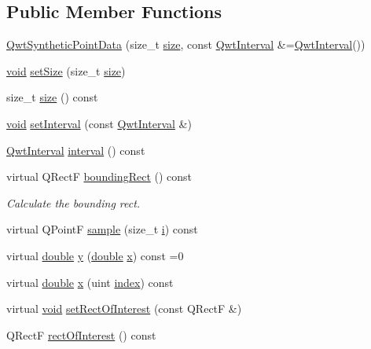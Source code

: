 \subsection*{Public Member Functions}
\begin{DoxyCompactItemize}
\item 
\hyperlink{class_qwt_synthetic_point_data_ad2980a20669d9703046e9ded9cacf496}{Qwt\-Synthetic\-Point\-Data} (size\-\_\-t \hyperlink{glext_8h_a014d89bd76f74ef3a29c8f04b473eb76}{size}, const \hyperlink{class_qwt_interval}{Qwt\-Interval} \&=\hyperlink{class_qwt_interval}{Qwt\-Interval}())
\item 
\hyperlink{group___u_a_v_objects_plugin_ga444cf2ff3f0ecbe028adce838d373f5c}{void} \hyperlink{class_qwt_synthetic_point_data_a321754c5acac77e0e5685968b1cdfdae}{set\-Size} (size\-\_\-t \hyperlink{glext_8h_a014d89bd76f74ef3a29c8f04b473eb76}{size})
\item 
size\-\_\-t \hyperlink{class_qwt_synthetic_point_data_a61b2cc26e1b5fa4a64e29273cf3e1599}{size} () const 
\item 
\hyperlink{group___u_a_v_objects_plugin_ga444cf2ff3f0ecbe028adce838d373f5c}{void} \hyperlink{class_qwt_synthetic_point_data_a1a0b2548b496affcf65272acd86c6700}{set\-Interval} (const \hyperlink{class_qwt_interval}{Qwt\-Interval} \&)
\item 
\hyperlink{class_qwt_interval}{Qwt\-Interval} \hyperlink{class_qwt_synthetic_point_data_acd5ffffb670778cfd714bc915615851e}{interval} () const 
\item 
virtual Q\-Rect\-F \hyperlink{class_qwt_synthetic_point_data_a89296d373856825047f48e86d7731b0a}{bounding\-Rect} () const 
\begin{DoxyCompactList}\small\item\em Calculate the bounding rect. \end{DoxyCompactList}\item 
virtual Q\-Point\-F \hyperlink{class_qwt_synthetic_point_data_a70d3ed6bfd764878f1709ab6b55e2f0e}{sample} (size\-\_\-t \hyperlink{uavobjecttemplate_8m_a6f6ccfcf58b31cb6412107d9d5281426}{i}) const 
\item 
virtual \hyperlink{_super_l_u_support_8h_a8956b2b9f49bf918deed98379d159ca7}{double} \hyperlink{class_qwt_synthetic_point_data_af65186bea0056b3f7f46814c61d68c99}{y} (\hyperlink{_super_l_u_support_8h_a8956b2b9f49bf918deed98379d159ca7}{double} \hyperlink{glext_8h_a1db9d104e3c2128177f26aff7b46982f}{x}) const =0
\item 
virtual \hyperlink{_super_l_u_support_8h_a8956b2b9f49bf918deed98379d159ca7}{double} \hyperlink{class_qwt_synthetic_point_data_ab14ef450ef097f05dbb8b8d75202538b}{x} (uint \hyperlink{glext_8h_ab47dd9958bcadea08866b42bf358e95e}{index}) const 
\item 
virtual \hyperlink{group___u_a_v_objects_plugin_ga444cf2ff3f0ecbe028adce838d373f5c}{void} \hyperlink{class_qwt_synthetic_point_data_a39cc8512e7d8beecde003f7781174b84}{set\-Rect\-Of\-Interest} (const Q\-Rect\-F \&)
\item 
Q\-Rect\-F \hyperlink{class_qwt_synthetic_point_data_a00ead6b5e6cbc06d87af6edaa518d05f}{rect\-Of\-Interest} () const 
\end{DoxyCompactItemize}
